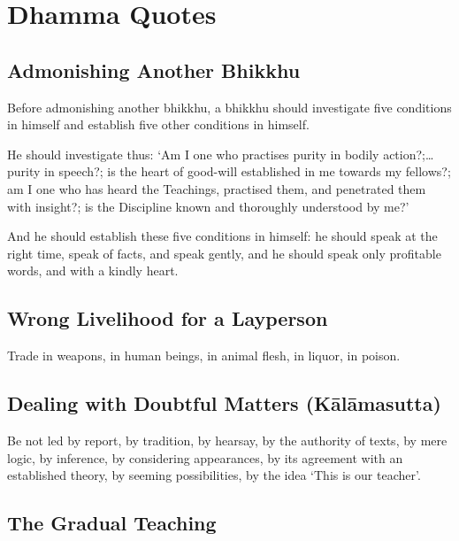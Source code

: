 \chapter{Dhamma Quotes}

\section*{Admonishing Another Bhikkhu}

Before admonishing another bhikkhu, a bhikkhu should investigate five conditions
in himself and establish five other conditions in himself.

He should investigate thus: ‘Am I one who practises purity in bodily action?;…
purity in speech?; is the heart of good-will established in me towards my
fellows?; am I one who has heard the Teachings, practised them, and penetrated
them with insight?; is the Discipline known and thoroughly understood by me?’

And he should establish these five conditions in himself: he should speak at the
right time, speak of facts, and speak gently, and he should speak only
profitable words, and with a kindly heart.\\
\mbox{}

\section*{Wrong Livelihood for a Layperson}

Trade in weapons, in human beings, in animal flesh, in liquor, in poison.


\vspace*{-\baselineskip}

\section*{Dealing with Doubtful Matters (Kālāmasutta)}

Be not led by report, by tradition, by hearsay, by the authority of texts, by
mere logic, by inference, by considering appearances, by its agreement with an
established theory, by seeming possibilities, by the idea ‘This is our teacher’.


\vspace*{-\baselineskip}

\section*{The Gradual Teaching}


